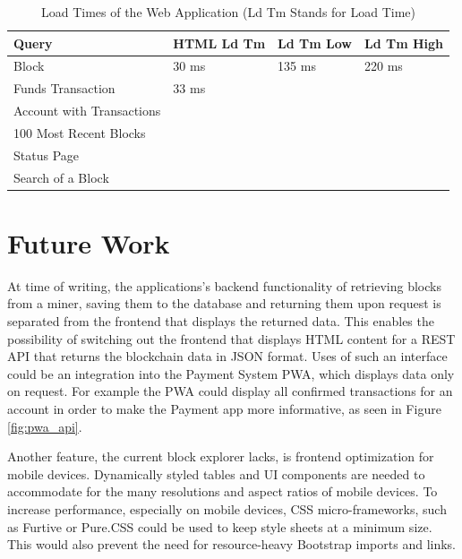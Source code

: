 \begin{table}[]
\centering
\caption{Load Times of the Web Application (Ld Tm Stands for Load Time)}
\label{tab:query}
\begin{tabular}{|l|l|l|l|}
\hline
\textbf{Query}            & \textbf{HTML Ld Tm} & \textbf{Ld Tm Low} & \textbf{Ld Tm High} \\ \hline
Block                     & 30 ms                   & 135 ms                 & 220 ms                  \\ \hline
Funds Transaction         & 33 ms                   &                        &                         \\ \hline
Account with Transactions &                         &                        &                         \\ \hline
100 Most Recent Blocks    &                         &                        &                         \\ \hline
Status Page               &                         &                        &                         \\ \hline
Search of a Block         &                         &                        &                         \\ \hline
\end{tabular}
\end{table}
\pagebreak

\section{Future Work}
At time of writing, the applications's backend functionality of retrieving blocks from a miner, saving them to the database and returning them upon request is separated from the frontend that displays the returned data. This enables the possibility of switching out the frontend that displays HTML content for a REST API that returns the blockchain data in JSON format. Uses of such an interface could be an integration into the Payment System PWA, which displays data only on request. For example the PWA could display all confirmed transactions for an account in order to make the Payment app more informative, as seen in Figure \ref{fig:pwa_api}.

Another feature, the current block explorer lacks, is frontend optimization for mobile devices. Dynamically styled tables and UI components are needed to accommodate for the many resolutions and aspect ratios of mobile devices. To increase performance, especially on mobile devices, CSS micro-frameworks, such as Furtive \cite{furtive} or Pure.CSS \cite{pure} could be used to keep style sheets at a minimum size. This would also prevent the need for resource-heavy Bootstrap imports and links.
\\
\\
\\

